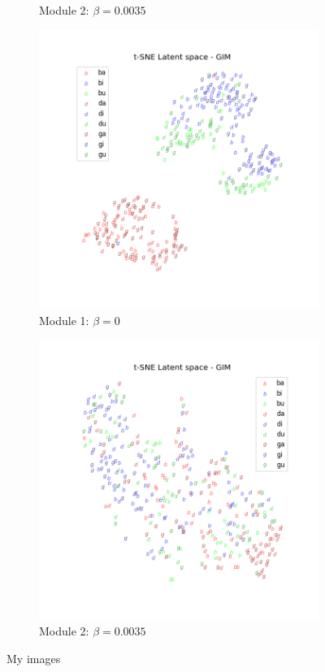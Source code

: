 \begin{figure}[h]
\begin{subfigure}{0.45\linewidth}
		\caption{Module 2: $\beta=0.0035$}
		\label{fig:t-sne-kld33-module2}
	\end{subfigure}
	\vspace{0cm}
	\begin{subfigure}{0.45\linewidth}
		\centering					
		\includegraphics[width=\linewidth]{"t-sne kld=0 module 1"}
		\caption{Module 1: $\beta=0$}
		\label{fig:t-sne-kld0-module-1}
	\end{subfigure}
	\hspace{0cm}
	\begin{subfigure}{0.45\linewidth}
		\centering
		\includegraphics[width=\linewidth]{"t-sne kld=0 module 2"}
		\caption{Module 2: $\beta=0.0035$}
		\label{fig:t-sne-kld0-module-2}
	\end{subfigure}
	\caption{My images}
	\label{fig:myimages}
\end{figure}